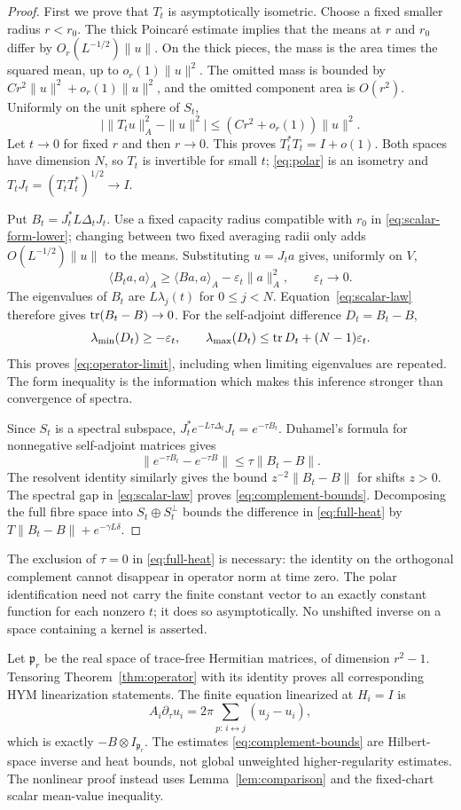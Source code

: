 \begin{proof}
First we prove that $T_t$ is asymptotically isometric. Choose a fixed
smaller radius $r<r_0$. The thick Poincar\'e estimate implies that
the means at $r$ and $r_0$ differ by
$O_r(L^{-1/2})\|u\|$. On the thick pieces, the mass is the area
times the squared mean, up to $o_r(1)\|u\|^2$. The omitted mass is
bounded by $Cr^2\|u\|^2+o_r(1)\|u\|^2$, and the omitted component
area is $O(r^2)$. Uniformly on the unit sphere of $S_t$,
\[
 \bigl|\|T_tu\|_A^2-\|u\|^2\bigr|
 \le(Cr^2+o_r(1))\|u\|^2.
\]
Let $t\to0$ for fixed $r$ and then $r\to0$. This proves
$T_t^*T_t=I+o(1)$. Both spaces have dimension $N$, so $T_t$ is
invertible for small $t$; \eqref{eq:polar} is an isometry and
$T_tJ_t=(T_tT_t^*)^{1/2}\to I$.

Put $B_t=J_t^*L\Delta_tJ_t$. Use a fixed capacity radius compatible
with $r_0$ in \eqref{eq:scalar-form-lower}; changing between two
fixed averaging radii only adds $O(L^{-1/2})\|u\|$ to the means.
Substituting $u=J_ta$ gives, uniformly on $V$,
\[
 \langle B_ta,a\rangle_A
 \ge\langle Ba,a\rangle_A-\varepsilon_t\|a\|_A^2,
 \qquad\varepsilon_t\to0.
\]
The eigenvalues of $B_t$ are $L\lambda_j(t)$ for $0\le j<N$.
Equation~\eqref{eq:scalar-law} therefore gives
$\operatorname{tr}(B_t-B)\to0$. For the self-adjoint difference $D_t=B_t-B$,
\[
 \lambda_{\min}(D_t)\ge-\varepsilon_t,\qquad
 \lambda_{\max}(D_t)\le\operatorname{tr} D_t+(N-1)\varepsilon_t.
\]
This proves \eqref{eq:operator-limit}, including when limiting
eigenvalues are repeated. The form inequality is the information
which makes this inference stronger than convergence of spectra.

Since $S_t$ is a spectral subspace,
$J_t^*e^{-L\tau\Delta_t}J_t=e^{-\tau B_t}$.
Duhamel's formula for nonnegative self-adjoint matrices gives
\[
 \|e^{-\tau B_t}-e^{-\tau B}\|\le\tau\|B_t-B\|.
\]
The resolvent identity similarly gives the bound
$z^{-2}\|B_t-B\|$ for shifts $z>0$.
The spectral gap in \eqref{eq:scalar-law} proves
\eqref{eq:complement-bounds}. Decomposing the full fibre space into
$S_t\oplus S_t^\perp$ bounds the difference in \eqref{eq:full-heat}
by $T\|B_t-B\|+e^{-\gamma L\delta}$.
\end{proof}

The exclusion of $\tau=0$ in \eqref{eq:full-heat} is necessary:
the identity on the orthogonal complement cannot disappear in
operator norm at time zero. The polar identification need not carry
the finite constant vector to an exactly constant function for
each nonzero $t$; it does so asymptotically. No unshifted inverse
on a space containing a kernel is asserted.

Let $\mathfrak p_r$ be the real space of trace-free Hermitian matrices,
of dimension $r^2-1$. Tensoring Theorem~\ref{thm:operator} with its
identity proves all corresponding HYM linearization statements.
The finite equation linearized at $H_i=I$ is
\[
 A_i\partial_\tau u_i=2\pi\sum_{p:\,i\leftrightarrow j}(u_j-u_i),
\]
which is exactly $-B\otimes I_{\mathfrak p_r}$. The estimates
\eqref{eq:complement-bounds} are Hilbert-space inverse and heat
bounds, not global unweighted higher-regularity estimates. The
nonlinear proof instead uses Lemma~\ref{lem:comparison} and the
fixed-chart scalar mean-value inequality.
